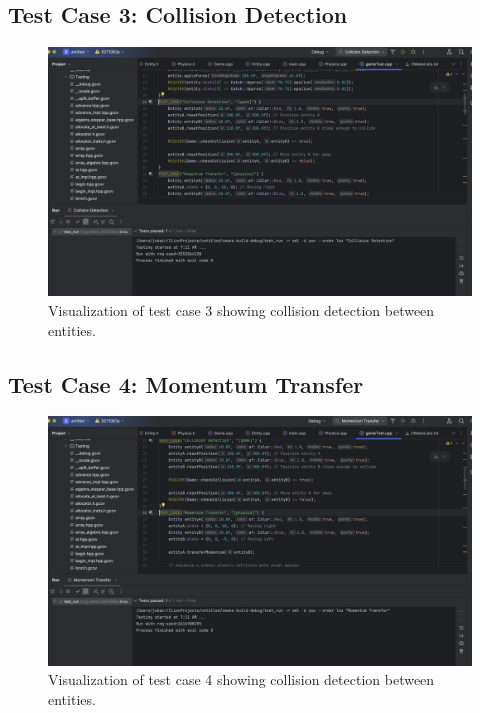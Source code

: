 \documentclass[12pt]{article}
\begin{document}
\subsection{Test Case 3: Collision Detection}

\begin{figure}[h!]
    \centering
    \includegraphics[width=\linewidth]{t3.png} 
    \caption{Visualization of test case 3 showing collision detection between entities.}
    \label{fig:test_case_3}
\end{figure}
\FloatBarrier
\subsection{Test Case 4: Momentum Transfer}

\begin{figure}[h!]
    \centering
    \includegraphics[width=\linewidth]{t4.png} 
    \caption{Visualization of test case 4 showing collision detection between entities.}
    \label{fig:test_case_4}
\end{figure}
\FloatBarrier
\end{document}
